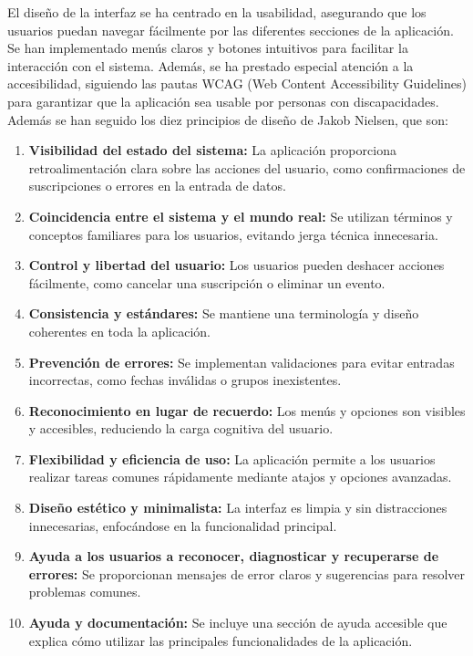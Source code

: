 \newpage
El diseño de la interfaz se ha centrado en la usabilidad, asegurando que los usuarios puedan navegar fácilmente por las diferentes secciones de la aplicación. Se han implementado menús claros y botones intuitivos para facilitar la interacción con el sistema. Además, se ha prestado especial atención a la accesibilidad, siguiendo las pautas WCAG (Web Content Accessibility Guidelines) para garantizar que la aplicación sea usable por personas con discapacidades.
\newline\newline
Además se han seguido los diez principios de diseño de Jakob Nielsen\cite{nielsen10principles}, que son:
\begin{enumerate}
    \item \textbf{Visibilidad del estado del sistema:} La aplicación proporciona retroalimentación clara sobre las acciones del usuario, como confirmaciones de suscripciones o errores en la entrada de datos.
    \item \textbf{Coincidencia entre el sistema y el mundo real:} Se utilizan términos y conceptos familiares para los usuarios, evitando jerga técnica innecesaria.
    \item \textbf{Control y libertad del usuario:} Los usuarios pueden deshacer acciones fácilmente, como cancelar una suscripción o eliminar un evento.
    \item \textbf{Consistencia y estándares:} Se mantiene una terminología y diseño coherentes en toda la aplicación.
    \item \textbf{Prevención de errores:} Se implementan validaciones para evitar entradas incorrectas, como fechas inválidas o grupos inexistentes.
    \item \textbf{Reconocimiento en lugar de recuerdo:} Los menús y opciones son visibles y accesibles, reduciendo la carga cognitiva del usuario.
    \item \textbf{Flexibilidad y eficiencia de uso:} La aplicación permite a los usuarios realizar tareas comunes rápidamente mediante atajos y opciones avanzadas.
    \item \textbf{Diseño estético y minimalista:} La interfaz es limpia y sin distracciones innecesarias, enfocándose en la funcionalidad principal.
    \item \textbf{Ayuda a los usuarios a reconocer, diagnosticar y recuperarse de errores:} Se proporcionan mensajes de error claros y sugerencias para resolver problemas comunes.
    \item \textbf{Ayuda y documentación:} Se incluye una sección de ayuda accesible que explica cómo utilizar las principales funcionalidades de la aplicación.
\end{enumerate}